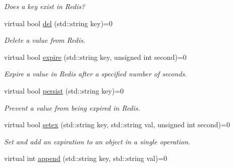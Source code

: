 \begin{DoxyCompactItemize}
\begin{DoxyCompactList}\small\item\em Does a key exist in Redis? \end{DoxyCompactList}\item 
virtual bool \hyperlink{classRedisInterface_a320ec4f76fd83d767dc476a6ca330957}{del} (std\+::string key)=0\hypertarget{classRedisInterface_a320ec4f76fd83d767dc476a6ca330957}{}\label{classRedisInterface_a320ec4f76fd83d767dc476a6ca330957}

\begin{DoxyCompactList}\small\item\em Delete a value from Redis. \end{DoxyCompactList}\item 
virtual bool \hyperlink{classRedisInterface_a1bccb873c675701ce5f9c828067ba37f}{expire} (std\+::string key, unsigned int second)=0\hypertarget{classRedisInterface_a1bccb873c675701ce5f9c828067ba37f}{}\label{classRedisInterface_a1bccb873c675701ce5f9c828067ba37f}

\begin{DoxyCompactList}\small\item\em Expire a value in Redis after a specified number of seconds. \end{DoxyCompactList}\item 
virtual bool \hyperlink{classRedisInterface_ac2eaaa5dc9647ac1663e967deea12431}{persist} (std\+::string key)=0\hypertarget{classRedisInterface_ac2eaaa5dc9647ac1663e967deea12431}{}\label{classRedisInterface_ac2eaaa5dc9647ac1663e967deea12431}

\begin{DoxyCompactList}\small\item\em Prevent a value from being expired in Redis. \end{DoxyCompactList}\item 
virtual bool \hyperlink{classRedisInterface_abded05a0334cf85620cd1b0662466e42}{setex} (std\+::string key, std\+::string val, unsigned int second)=0\hypertarget{classRedisInterface_abded05a0334cf85620cd1b0662466e42}{}\label{classRedisInterface_abded05a0334cf85620cd1b0662466e42}

\begin{DoxyCompactList}\small\item\em Set and add an expiration to an object in a single operation. \end{DoxyCompactList}\item 
virtual int \hyperlink{classRedisInterface_a0d01f532e140ea89b6ff4918654e8749}{append} (std\+::string key, std\+::string val)=0\hypertarget{classRedisInterface_a0d01f532e140ea89b6ff4918654e8749}{}\label{classRedisInterface_a0d01f532e140ea89b6ff4918654e8749}


\end{DoxyCompactItemize}
